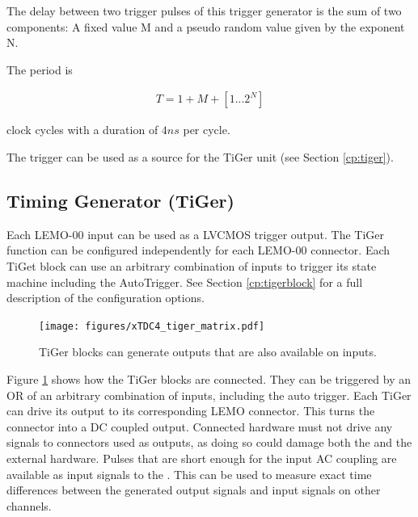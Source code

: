		The delay between two trigger pulses of this trigger generator is the sum of two components: A fixed value M and a pseudo random value given by the exponent N. \par

		The period is

		\begin{align}
			T = 1 + M + [1...2^N]
		\end{align}

		clock cycles with a duration of $4 ns$ per cycle.\par
		
		The trigger can be used as a source for the TiGer unit (see Section \ref{cp:tiger}).
	
	
	\subsection{Timing Generator (TiGer)\label{cp:tiger}}
		Each LEMO-00 input can be used as a LVCMOS trigger output. The TiGer function can be configured independently for each LEMO-00 connector. 
		Each TiGet block can use an arbitrary combination of inputs to trigger its state machine including the AutoTrigger.
		See Section \ref{cp:tigerblock} for a full description of the configuration options.

		\begin{figure}[ht]
			\begin{center}
				\texttt{[image: figures/xTDC4\_tiger\_matrix.pdf]}
				\caption{TiGer blocks can generate outputs that are also available on inputs.\label{fig:matrix}}
			\end{center}
		\end{figure}

		Figure \ref{fig:matrix} shows how the TiGer blocks are connected. They can be triggered by an OR of an arbitrary combination of inputs, 
		including the auto trigger. Each TiGer can drive its output to its corresponding LEMO connector. This turns the connector into a DC coupled output. 
		Connected hardware must not drive any signals to connectors used as outputs, as doing so could damage both the \deviceName and the external hardware.
		Pulses that are short enough for the input AC coupling are available as input signals to the \deviceName. 
		This can be used to measure exact time differences between the generated output signals and input signals on other channels.


